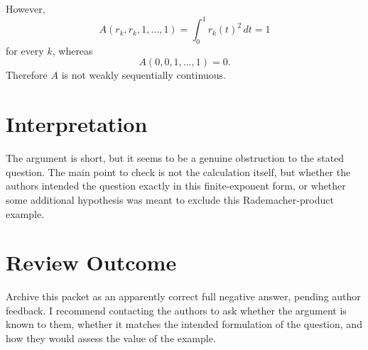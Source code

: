 \documentclass[11pt]{article}
\begin{document}
However,
\[
  A(r_k,r_k,1,\ldots,1)
  =
  \int_0^1 r_k(t)^2\,dt
  =
  1
\]
for every \(k\), whereas
\[
  A(0,0,1,\ldots,1)=0.
\]
Therefore \(A\) is not weakly sequentially continuous.

\section*{Interpretation}

The argument is short, but it seems to be a genuine obstruction to the stated
question. The main point to check is not the calculation itself, but whether
the authors intended the question exactly in this finite-exponent form, or
whether some additional hypothesis was meant to exclude this Rademacher-product
example.

\section*{Review Outcome}

Archive this packet as an apparently correct full negative answer, pending
author feedback. I recommend contacting the authors to ask whether the
argument is known to them, whether it matches the intended formulation of the
question, and how they would assess the value of the example.
\end{document}
